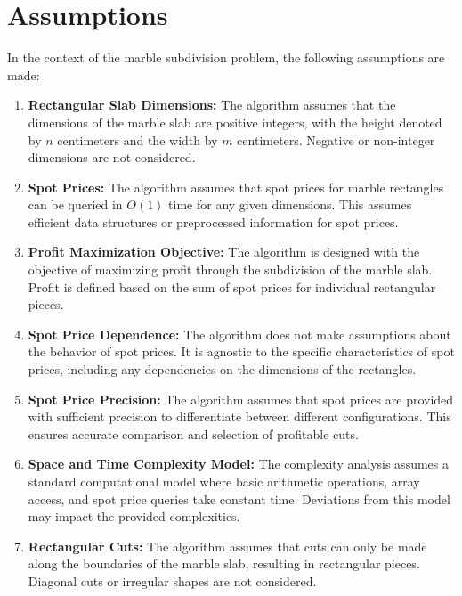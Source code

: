 \documentclass{article}
\begin{document}
\section{Assumptions}

In the context of the marble subdivision problem, the following assumptions are made:

\begin{enumerate}
    \item \textbf{Rectangular Slab Dimensions:} The algorithm assumes that the dimensions of the marble slab are positive integers, with the height denoted by $n$ centimeters and the width by $m$ centimeters. Negative or non-integer dimensions are not considered.

    \item \textbf{Spot Prices:} The algorithm assumes that spot prices for marble rectangles can be queried in $O(1)$ time for any given dimensions. This assumes efficient data structures or preprocessed information for spot prices.

    \item \textbf{Profit Maximization Objective:} The algorithm is designed with the objective of maximizing profit through the subdivision of the marble slab. Profit is defined based on the sum of spot prices for individual rectangular pieces.

    \item \textbf{Spot Price Dependence:} The algorithm does not make assumptions about the behavior of spot prices. It is agnostic to the specific characteristics of spot prices, including any dependencies on the dimensions of the rectangles.

    \item \textbf{Spot Price Precision:} The algorithm assumes that spot prices are provided with sufficient precision to differentiate between different configurations. This ensures accurate comparison and selection of profitable cuts.

    \item \textbf{Space and Time Complexity Model:} The complexity analysis assumes a standard computational model where basic arithmetic operations, array access, and spot price queries take constant time. Deviations from this model may impact the provided complexities.

    \item \textbf{Rectangular Cuts:} The algorithm assumes that cuts can only be made along the boundaries of the marble slab, resulting in rectangular pieces. Diagonal cuts or irregular shapes are not considered.


\end{enumerate}
\end{document}
